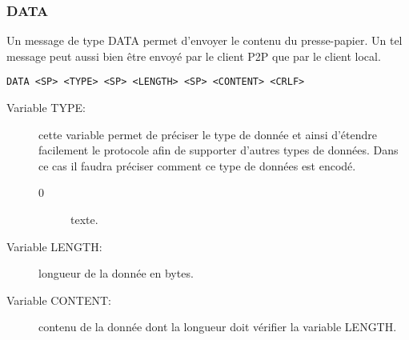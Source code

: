 \subsubsection*{DATA}
Un message de type DATA permet d'envoyer le contenu du presse-papier. Un tel
message peut aussi bien être envoyé par le client P2P que par le client local.
\begin{verbatim}
DATA <SP> <TYPE> <SP> <LENGTH> <SP> <CONTENT> <CRLF>
\end{verbatim}
\begin{description}
\item[Variable TYPE:] cette variable permet de préciser le type
  de donnée et ainsi d'étendre facilement le protocole afin de supporter
  d'autres types de données. Dans ce cas il faudra préciser comment ce type
  de données est encodé.
  \begin{description}
  \item[0] texte.
  \end{description}
\item[Variable LENGTH:] longueur de la donnée en bytes.
\item[Variable CONTENT:] contenu de la donnée dont la longueur
  doit vérifier la variable LENGTH.
\end{description}
